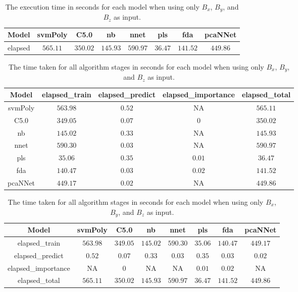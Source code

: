 \begin{table}[!ht]
	\centering
	\begin{tabular}{|c|c|c|c|c|c|c|c|}
		\hline
		Model & svmPoly & C5.0 & nb & nnet & pls & fda & pcaNNet \\ \hline
		elapsed & $565.11$ & $350.02$ & $145.93$ & $590.97$ & $36.47$ & $141.52$ & $449.86$ \\ \hline
	\end{tabular}
	\caption{The execution time in seconds for each model when using only $B_{x}$, $B_{y}$, and $B_{z}$ as input.}
	\label{tab:time:reverse:coord:total}
\end{table}

\begin{table}[!ht]
	\centering
	\begin{tabular}{|c|c|c|c|c|}
		\hline
		Model & elapsed_train & elapsed_predict & elapsed_importance & elapsed_total \\ \hline
		svmPoly & $563.98$ & $0.52$ & NA & $565.11$ \\ \hline
		C5.0 & $349.05$ & $0.07$ & $0$ & $350.02$ \\ \hline
		nb & $145.02$ & $0.33$ & NA & $145.93$ \\ \hline
		nnet & $590.30$ & $0.03$ & NA & $590.97$ \\ \hline
		pls & $35.06$ & $0.35$ & $0.01$ & $36.47$ \\ \hline
		fda & $140.47$ & $0.03$ & $0.02$ & $141.52$ \\ \hline
		pcaNNet & $449.17$ & $0.02$ & NA & $449.86$ \\ \hline
	\end{tabular}
	\caption{The time taken for all algorithm stages in seconds for each model when using only $B_{x}$, $B_{y}$, and $B_{z}$ as input.}
	\label{tab:time:coord}
\end{table}

\begin{table}[!ht]
	\centering
	\begin{tabular}{|c|c|c|c|c|c|c|c|}
		\hline
		Model & svmPoly & C5.0 & nb & nnet & pls & fda & pcaNNet \\ \hline
		elapsed_train & $563.98$ & $349.05$ & $145.02$ & $590.30$ & $35.06$ & $140.47$ & $449.17$ \\ \hline
		elapsed_predict & $0.52$ & $0.07$ & $0.33$ & $0.03$ & $0.35$ & $0.03$ & $0.02$ \\ \hline
		elapsed_importance & NA & $0$ & NA & NA & $0.01$ & $0.02$ & NA \\ \hline
		elapsed_total & $565.11$ & $350.02$ & $145.93$ & $590.97$ & $36.47$ & $141.52$ & $449.86$ \\ \hline
	\end{tabular}
	\caption{The time taken for all algorithm stages in seconds for each model when using only $B_{x}$, $B_{y}$, and $B_{z}$ as input.}
	\label{tab:time:reverse:coord}
\end{table}


